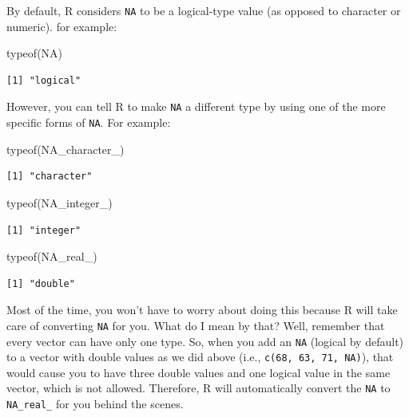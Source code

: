 \documentclass[
  letterpaper,
  DIV=11,
  numbers=noendperiod]{scrreprt}
\newenvironment{Shaded}{\begin{snugshade}}{\end{snugshade}}
\newcommand{\ConstantTok}[1]{\textcolor[rgb]{0.56,0.35,0.01}{#1}}
\newcommand{\FunctionTok}[1]{\textcolor[rgb]{0.28,0.35,0.67}{#1}}
\newcommand{\NormalTok}[1]{\textcolor[rgb]{0.00,0.23,0.31}{#1}}
\begin{document}
By default, R considers \texttt{NA} to be a logical-type value (as
opposed to character or numeric). for example:

\begin{Shaded}
\begin{Highlighting}[]
\FunctionTok{typeof}\NormalTok{(}\ConstantTok{NA}\NormalTok{)}
\end{Highlighting}
\end{Shaded}

\begin{verbatim}
[1] "logical"
\end{verbatim}

However, you can tell R to make \texttt{NA} a different type by using
one of the more specific forms of \texttt{NA}. For example:

\begin{Shaded}
\begin{Highlighting}[]
\FunctionTok{typeof}\NormalTok{(}\ConstantTok{NA\_character\_}\NormalTok{)}
\end{Highlighting}
\end{Shaded}

\begin{verbatim}
[1] "character"
\end{verbatim}

\begin{Shaded}
\begin{Highlighting}[]
\FunctionTok{typeof}\NormalTok{(}\ConstantTok{NA\_integer\_}\NormalTok{)}
\end{Highlighting}
\end{Shaded}

\begin{verbatim}
[1] "integer"
\end{verbatim}

\begin{Shaded}
\begin{Highlighting}[]
\FunctionTok{typeof}\NormalTok{(}\ConstantTok{NA\_real\_}\NormalTok{)}
\end{Highlighting}
\end{Shaded}

\begin{verbatim}
[1] "double"
\end{verbatim}

Most of the time, you won't have to worry about doing this because R
will take care of converting \texttt{NA} for you. What do I mean by
that? Well, remember that every vector can have only one type. So, when
you add an \texttt{NA} (logical by default) to a vector with double
values as we did above (i.e., \texttt{c(68,\ 63,\ 71,\ NA)}), that would
cause you to have three double values and one logical value in the same
vector, which is not allowed. Therefore, R will automatically convert
the \texttt{NA} to \texttt{NA\_real\_} for you behind the scenes.
\end{document}

